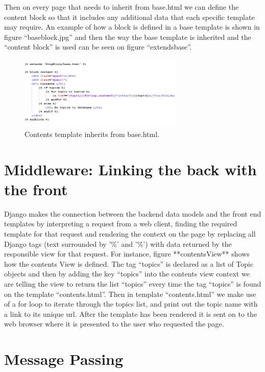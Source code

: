 \documentclass{l3proj}
\begin{document}
Then on every page that needs to inherit from base.html we can define the content block so that it includes any additional data that each specific template may require. An example of how a block is defined in a base template is shown in figure “baseblock.jpg” and then the way the base template is inherited and the “content block” is used can be seen on figure ``extendsbase''.
\begin{figure}[h!]
\caption{Contents template inherits from base.html.}
\centering
\includegraphics[width=0.7\textwidth]{images/extendsbase.jpg}
\end{figure}
\section{Middleware: Linking the back with the front}
Django makes the connection between the backend data models and the front end templates by interpreting a request from a web client, finding the required template for that request and rendering the context on the page by replacing all Django tags (text surrounded by '{\%' and '\%}') with data returned by the responsible view for that request. For instance, figure **contentsView** shows how the contents View is defined. The tag “topics” is declared as a list of Topic objects and then by adding the key “topics” into the contents view context we are telling the view to return the list “topics” every time the tag “topics” is found on the template “contents.html”. Then in template “contents.html” we make use of a for loop to iterate through the topics list, and print out the topic name with a link to its unique url. After the template has been rendered it is sent on to the web browser where it is presented to the user who requested the page.
\section{Message Passing}
\end{document}
